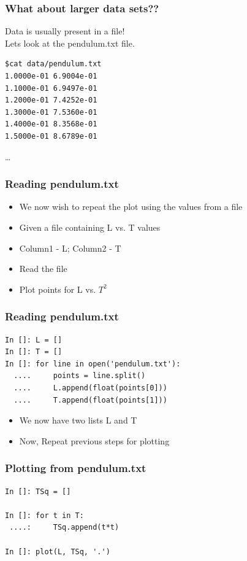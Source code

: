 \documentclass[14pt,compress]{beamer}
\begin{document}
\begin{frame}[fragile]
\frametitle{What about larger data sets??}
\alert{Data is usually present in a file!} \\
Lets look at the pendulum.txt file.
\begin{lstlisting}
$cat data/pendulum.txt 
1.0000e-01 6.9004e-01
1.1000e-01 6.9497e-01
1.2000e-01 7.4252e-01
1.3000e-01 7.5360e-01
1.4000e-01 8.3568e-01
1.5000e-01 8.6789e-01
\end{lstlisting}
\ldots
\end{frame}

\begin{frame}[fragile]
\frametitle{Reading pendulum.txt}
\begin{itemize}
  \item We now wish to repeat the plot using the values from a file
  \item Given a file containing L vs. T values 
  \item Column1 - L; Column2 - T  
  \item Read the file
  \item Plot points for L vs. $T^2$ 
\end{itemize}
\end{frame}

\begin{frame}[fragile]
\frametitle{Reading pendulum.txt}
\begin{lstlisting}
In []: L = []
In []: T = []
In []: for line in open('pendulum.txt'):
  ....     points = line.split()
  ....     L.append(float(points[0]))
  ....     T.append(float(points[1]))
\end{lstlisting}
\begin{itemize}
\item We now have two lists L and T
\item Now, Repeat previous steps for plotting
\end{itemize}
\end{frame}

\begin{frame}[fragile]
\frametitle{Plotting from pendulum.txt}
\begin{lstlisting}
In []: TSq = []

In []: for t in T:
 ....:     TSq.append(t*t)

In []: plot(L, TSq, '.')
\end{lstlisting}
\end{frame}
\end{document}
